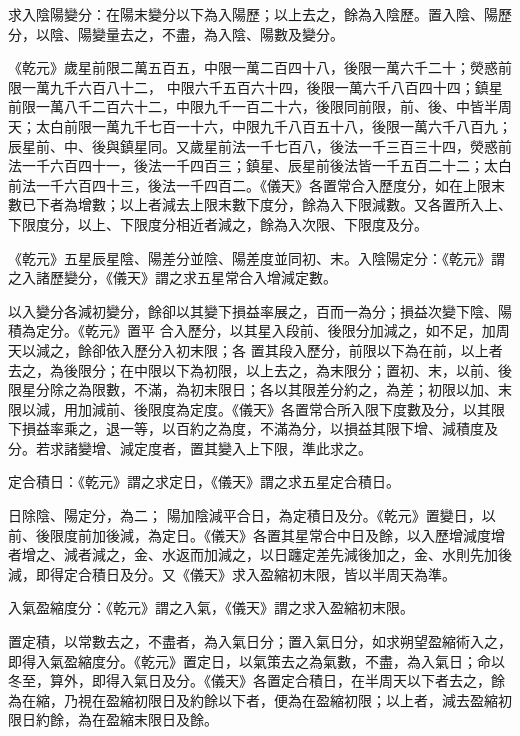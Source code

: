 \begin{pinyinscope}
 求入陰陽變分：在陽末變分以下為入陽歷；以上去之，餘為入陰歷。置入陰、陽歷分，以陰、陽變量去之，不盡，為入陰、陽數及變分。



 《乾元》歲星前限二萬五百五，中限一萬二百四十八，後限一萬六千二十；熒惑前限一萬九千六百八十二，
 中限六千五百六十四，後限一萬六千八百四十四；鎮星前限一萬八千二百六十二，中限九千一百二十六，後限同前限，前、後、中皆半周天；太白前限一萬九千七百一十六，中限九千八百五十八，後限一萬六千八百九；辰星前、中、後與鎮星同。又歲星前法一千七百八，後法一千三百三十四，熒惑前法一千六百四十一，後法一千四百三；鎮星、辰星前後法皆一千五百二十二；太白前法一千六百四十三，後法一千四百二。《儀天》各置常合入歷度分，如在上限末數已下者為增數；以上者減去上限末數下度分，餘為入下限減數。又各置所入上、下限度分，以上、下限度分相近者減之，餘為入次限、下限度及分。



 《乾元》五星辰星陰、陽差分並陰、陽差度並同初、末。入陰陽定分：《乾元》謂之入諸歷變分，《儀天》謂之求五星常合入增減定數。



 以入變分各減初變分，餘卻以其變下損益率展之，百而一為分；損益次變下陰、陽積為定分。《乾元》置平
 合入歷分，以其星入段前、後限分加減之，如不足，加周天以減之，餘卻依入歷分入初末限；各
 置其段入歷分，前限以下為在前，以上者去之，為後限分；在中限以下為初限，以上去之，為末限分；置初、末，以前、後限星分除之為限數，不滿，為初末限日；各以其限差分約之，為差；初限以加、末限以減，用加減前、後限度為定度。《儀天》各置常合所入限下度數及分，以其限下損益率乘之，退一等，以百約之為度，不滿為分，以損益其限下增、減積度及分。若求諸變增、減定度者，置其變入上下限，準此求之。



 定合積日：《乾元》謂之求定日，《儀天》謂之求五星定合積日。



 日除陰、陽定分，為二；
 陽加陰減平合日，為定積日及分。《乾元》置變日，以前、後限度前加後減，為定日。《儀天》各置其星常合中日及餘，以入歷增減度增者增之、減者減之，金、水返而加減之，以日躔定差先減後加之，金、水則先加後減，即得定合積日及分。又《儀天》求入盈縮初末限，皆以半周天為準。



 入氣盈縮度分：《乾元》謂之入氣，《儀天》謂之求入盈縮初末限。



 置定積，以常數去之，不盡者，為入氣日分；置入氣日分，如求朔望盈縮術入之，即得入氣盈縮度分。《乾元》置定日，以氣策去之為氣數，不盡，為入氣日；命以冬至，算外，即得入氣日及分。《儀天》各置定合積日，在半周天以下者去之，餘為在縮，乃視在盈縮初限日及約餘以下者，便為在盈縮初限；以上者，減去盈縮初限日約餘，為在盈縮末限日及餘。




\end{pinyinscope}
